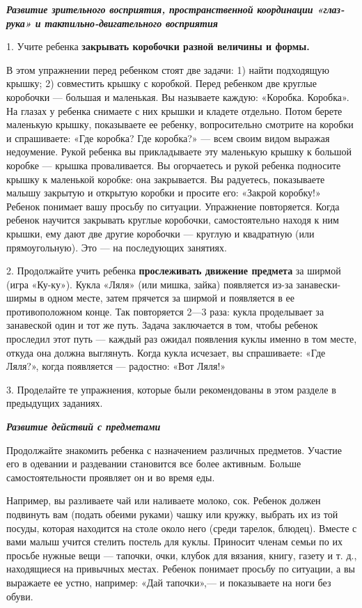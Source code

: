 \documentclass{book}
\renewcommand{\emph}[1]{\textit{#1}}
\begin{document}
\emph{\textbf{Развитие зрительного восприятия, пространственной
координации «глаз-рука» и тактильно-двигательного восприятия}}

1. Учите ребенка \textbf{закрывать коробочки разной величины и формы.}

В этом упражнении перед ребенком стоят две задачи: 1) найти подходящую
крышку; 2) совместить крышку с коробкой. Перед ребенком две круглые
коробочки --- большая и маленькая. Вы называете каждую: «Коробка.
Коробка». На глазах у ребенка снимаете с них крышки и кладете отдельно.
Потом берете маленькую крышку, показываете ее ребенку, вопросительно
смотрите на коробки и спрашиваете: «Где коробка? Где коробка?» --- всем
своим видом выражая недоумение. Рукой ребенка вы прикладываете эту
маленькую крышку к большой коробке --- крышка проваливается. Вы
огорчаетесь и рукой ребенка подносите крышку к маленькой коробке: она
закрывается. Вы радуетесь, показываете малышу закрытую и открытую
коробки и просите его: «Закрой коробку!» Ребенок понимает вашу просьбу
по ситуации. Упражнение повторяется. Когда ребенок научится закрывать
круглые коробочки, самостоятельно находя к ним крышки, ему дают две
другие коробочки --- круглую и квадратную (или прямоугольную). Это ---
на последующих занятиях.

2. Продолжайте учить ребенка \textbf{прослеживать движение предмета} за
ширмой (игра «Ку-ку»). Кукла «Ляля» (или мишка, зайка) появляется из-за
занавески-ширмы в одном месте, затем прячется за ширмой и появляется в
ее противоположном конце. Так повторяется 2---3 раза: кукла проделывает
за занавеской один и тот же путь. Задача заключается в том, чтобы
ребенок проследил этот путь --- каждый раз ожидал появления куклы именно
в том месте, откуда она должна выглянуть. Когда кукла исчезает, вы
спрашиваете: «Где Ляля?», когда появляется --- радостно: «Вот Ляля!»

3. Проделайте те упражнения, которые были рекомендованы в этом разделе в
предыдущих заданиях.

\emph{\textbf{Развитие действий с предметами}}

Продолжайте знакомить ребенка с назначением различных предметов. Участие
его в одевании и раздевании становится все более активным. Больше
самостоятельности проявляет он и во время еды.

Например, вы разливаете чай или наливаете молоко, сок. Ребенок должен
подвинуть вам (подать обеими руками) чашку или кружку, выбрать их из той
посуды, которая находится на столе около него (среди тарелок, блюдец).
Вместе с вами малыш учится стелить постель для куклы. Приносит членам
семьи по их просьбе нужные вещи --- тапочки, очки, клубок для вязания,
книгу, газету и т. д., находящиеся на привычных местах. Ребенок понимает
просьбу по ситуации, а вы выражаете ее устно, например: «Дай
тапочки»,--- и показываете на ноги без обуви.
\end{document}
